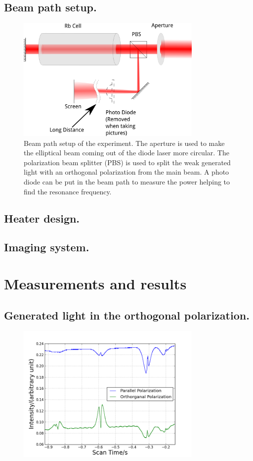 \documentclass[aps,twocolumn,secnumarabic,balancelastpage,amsmath,amssymb,nofootinbib]{revtex4}
\begin{document}
\subsection{Beam path setup.}
\begin{figure}
  \includegraphics[width=9cm]{apparatus.png}
  \caption{Beam path setup of the experiment. The aperture is used to make the elliptical beam coming out of the diode laser more circular. The polarization beam splitter (PBS) is used to split the weak generated light with an orthogonal polarization from the main beam. A photo diode can be put in the beam path to measure the power helping to find the resonance frequency.}
  \label{apparatus}
\end{figure}
\subsection{Heater design.}
\subsection{Imaging system.}

\section{Measurements and results}
\subsection{Generated light in the orthogonal polarization.}
\begin{figure}
  \includegraphics[width=9cm]{../data/5-16_csv/intensities.png}
  \caption{}
  \label{intensities}
\end{figure}
\end{document}
